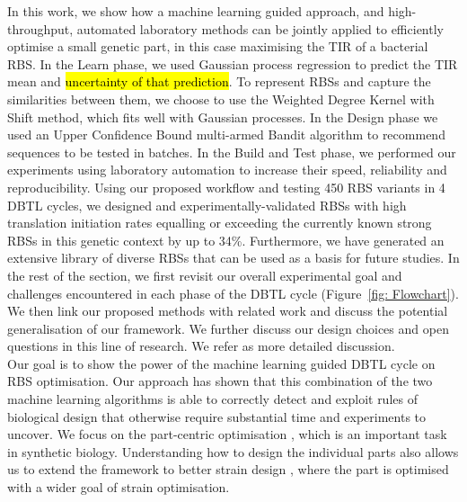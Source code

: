 \documentclass{scrartcl}[2013/05/29]%
\begin{document}
In this work, we show how a machine learning guided approach, and high-throughput, automated laboratory methods can be jointly applied to efficiently optimise a small genetic part, in this case maximising the TIR of a bacterial RBS.
In the Learn phase, we used Gaussian process regression to predict the TIR mean and \hl{uncertainty of that prediction}.
To represent RBSs and capture the similarities between them, we choose to use
the Weighted Degree Kernel with Shift method, which fits well with Gaussian processes.
In the Design phase we used an Upper Confidence Bound multi-armed Bandit algorithm to recommend sequences to be tested in batches.
In the Build and Test phase, we performed our experiments using laboratory
automation to increase their speed, reliability and reproducibility.
Using our proposed workflow and testing 450 RBS variants in 4 DBTL cycles,
we designed and experimentally-validated RBSs with high translation initiation rates equalling or exceeding the currently known strong RBSs in this genetic context by up to 34\%.
Furthermore, we have generated an extensive library of diverse RBSs that can be used as a basis for future studies.
In the rest of the section, we first revisit our overall experimental goal and challenges encountered in each phase of the
DBTL cycle (Figure~\ref{fig: Flowchart}).
We then link our proposed methods with related work and discuss the potential generalisation of our framework.
We further discuss our design choices and open questions in this line of research.
We refer \cite{zhang_synbio2021} as more detailed discussion.\\ 

Our goal is to show the power of the machine learning guided DBTL cycle on RBS optimisation.
Our approach has shown that this combination of the two machine learning algorithms is able to correctly detect and exploit rules of biological design that otherwise require substantial time and experiments to uncover.
We focus on the part-centric optimisation \cite{Hollerer2020}, which is an important task in synthetic biology. 
Understanding how to design the individual parts also allows us to extend the framework to better strain design \cite{Jervis2019}, where the part is optimised with a wider goal of strain optimisation.
\\
\end{document}
